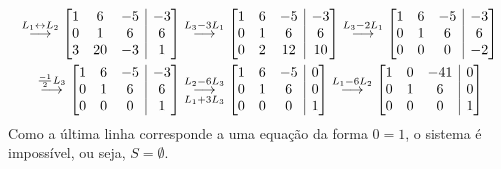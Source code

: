\documentclass[12pt,a4paper]{article}
\makeatletter
\newenvironment{amatrix}[1]{%
  \left[\begin{array}{@{}*{#1}{c}|c@{}}
}{%
  \end{array}\right]
}
\newcommand{\grstep}[2][\relax]{%
   \ensuremath{\mathrel{
       {\mathop{\longrightarrow}\limits^{#2\mathstrut}_{
                                     \begin{subarray}{l} #1 \end{subarray}}}}}}
\makeatother
\begin{document}
\begin{enumerate}
\begin{enumerate}
\begin{align*}
[A|B]
\grstep{ L_1 \leftrightarrow L_2 }
\begin{amatrix}{3}
 1 &  6 & -5 & -3 \\
 0 &  1 &  6 &  6 \\
 3 & 20 & -3 &  1
\end{amatrix}
&
\grstep{ L_3 - 3 L_1 }
\begin{amatrix}{3}
 1 & 6 & -5 & -3 \\
 0 & 1 &  6 &  6 \\
 0 & 2 & 12 & 10
\end{amatrix}
\grstep{ L_3 - 2 L_1 }
\begin{amatrix}{3}
 1 & 6 & -5 & -3 \\
 0 & 1 &  6 &  6 \\
 0 & 0 &  0 & -2
\end{amatrix} \\
\grstep{ \frac{-1}{2} L_3 }
\begin{amatrix}{3}
 1 & 6 & -5 & -3 \\
 0 & 1 &  6 &  6 \\
 0 & 0 &  0 & 1
\end{amatrix}
&
\grstep[ L_1 + 3 L_3 ]{ L_2 - 6 L_3 }
\begin{amatrix}{3}
 1 & 6 & -5 & 0 \\
 0 & 1 &  6 & 0 \\
 0 & 0 &  0 & 1
\end{amatrix}
\grstep{ L_1 - 6 L_2 }
\begin{amatrix}{3}
 1 & 0 & -41 & 0 \\
 0 & 1 &  6 & 0 \\
 0 & 0 &  0 & 1
\end{amatrix}
\end{align*}
Como a última linha corresponde a uma equação da forma $0 = 1$, o sistema é impossível, ou seja, $S = \emptyset$.
\end{enumerate}


\end{enumerate}
\end{document}
